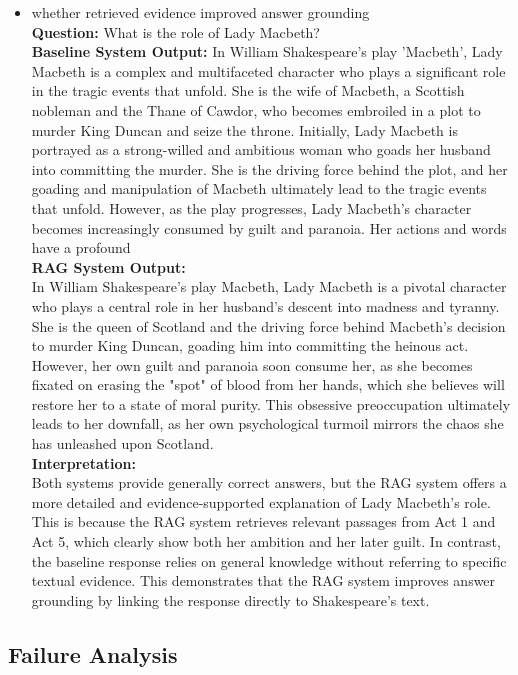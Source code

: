 \documentclass[10pt,conference]{IEEEtran}
\begin{document}
\begin{itemize}
    \item whether retrieved evidence improved answer grounding\\
    \textbf{Question:}  
    What is the role of Lady Macbeth?\\
    \textbf{Baseline System Output:}  
    In William Shakespeare's play 'Macbeth', Lady Macbeth is a complex and multifaceted character who plays a significant role in the tragic events that unfold. She is the wife of Macbeth, a Scottish nobleman and the Thane of Cawdor, who becomes embroiled in a plot to murder King Duncan and seize the throne. Initially, Lady Macbeth is portrayed as a strong-willed and ambitious woman who goads her husband into committing the murder. She is the driving force behind the plot, and her goading and manipulation of Macbeth ultimately lead to the tragic events that unfold. However, as the play progresses, Lady Macbeth's character becomes increasingly consumed by guilt and paranoia. Her actions and words have a profound\\
    
    \textbf{RAG System Output:}  \\
   In William Shakespeare's play Macbeth, Lady Macbeth is a pivotal character who plays a central role in her husband's descent into madness and tyranny. She is the queen of Scotland and the driving force behind Macbeth's decision to murder King Duncan, goading him into committing the heinous act. However, her own guilt and paranoia soon consume her, as she becomes fixated on erasing the "spot" of blood from her hands, which she believes will restore her to a state of moral purity. This obsessive preoccupation ultimately leads to her downfall, as her own psychological turmoil mirrors the chaos she has unleashed upon Scotland.\\
    
    \textbf{Interpretation:}\\
    Both systems provide generally correct answers, but the RAG system offers a more detailed and evidence-supported explanation of Lady Macbeth’s role. This is because the RAG system retrieves relevant passages from Act 1 and Act 5, which clearly show both her ambition and her later guilt. In contrast, the baseline response relies on general knowledge without referring to specific textual evidence. This demonstrates that the RAG system improves answer grounding by linking the response directly to Shakespeare’s text.
\end{itemize}

\subsection{Failure Analysis}
\end{document}

